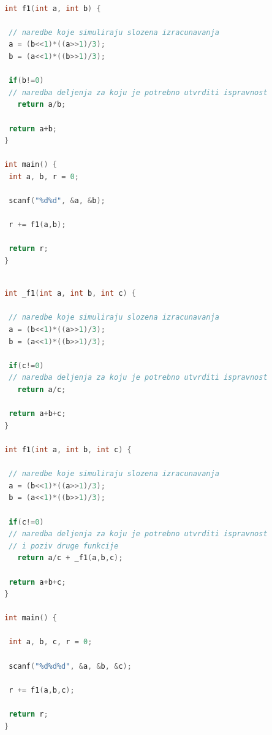 \documentclass[12pt,oneside]{memoir}
\begin{document}
\begin{lstlisting}[basicstyle=\fontsize{12}{4}\selectfont,language=C,frame=single,caption=Пример програма прве категорије (друга верзија),label=primer_nivo_1t]

int f1(int a, int b) {

 // naredbe koje simuliraju slozena izracunavanja
 a = (b<<1)*((a>>1)/3);
 b = (a<<1)*((b>>1)/3);
 
 if(b!=0)
 // naredba deljenja za koju je potrebno utvrditi ispravnost
   return a/b;
 
 return a+b;
}

int main() {
 int a, b, r = 0;
 
 scanf("%d%d", &a, &b);
 
 r += f1(a,b);

 return r;
}

\end{lstlisting}

\begin{lstlisting}[basicstyle=\fontsize{12}{4}\selectfont,language=C,frame=single,caption=Пример програма друге категорије (прва верзија),label=primer_nivo_2]

int _f1(int a, int b, int c) {

 // naredbe koje simuliraju slozena izracunavanja
 a = (b<<1)*((a>>1)/3);
 b = (a<<1)*((b>>1)/3);

 if(c!=0)
 // naredba deljenja za koju je potrebno utvrditi ispravnost
   return a/c;

 return a+b+c;
}

int f1(int a, int b, int c) {

 // naredbe koje simuliraju slozena izracunavanja
 a = (b<<1)*((a>>1)/3);
 b = (a<<1)*((b>>1)/3);

 if(c!=0)
 // naredba deljenja za koju je potrebno utvrditi ispravnost
 // i poziv druge funkcije 
   return a/c + _f1(a,b,c);

 return a+b+c;
}

int main() {

 int a, b, c, r = 0;

 scanf("%d%d%d", &a, &b, &c);

 r += f1(a,b,c);

 return r;
}


\end{lstlisting}
\end{document}
